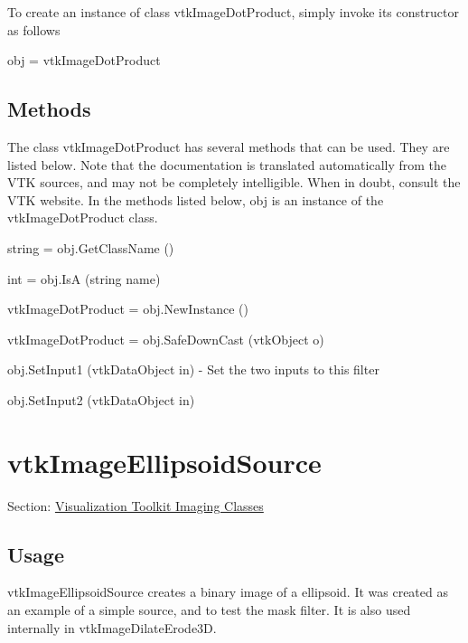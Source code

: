 To create an instance of class vtk\-Image\-Dot\-Product, simply invoke its constructor as follows \begin{DoxyVerb}  obj = vtkImageDotProduct
\end{DoxyVerb}
 \hypertarget{vtkwidgets_vtkxyplotwidget_Methods}{}\subsection{Methods}\label{vtkwidgets_vtkxyplotwidget_Methods}
The class vtk\-Image\-Dot\-Product has several methods that can be used. They are listed below. Note that the documentation is translated automatically from the V\-T\-K sources, and may not be completely intelligible. When in doubt, consult the V\-T\-K website. In the methods listed below, {\ttfamily obj} is an instance of the vtk\-Image\-Dot\-Product class. 
\begin{DoxyItemize}
\item {\ttfamily string = obj.\-Get\-Class\-Name ()}  
\item {\ttfamily int = obj.\-Is\-A (string name)}  
\item {\ttfamily vtk\-Image\-Dot\-Product = obj.\-New\-Instance ()}  
\item {\ttfamily vtk\-Image\-Dot\-Product = obj.\-Safe\-Down\-Cast (vtk\-Object o)}  
\item {\ttfamily obj.\-Set\-Input1 (vtk\-Data\-Object in)} -\/ Set the two inputs to this filter  
\item {\ttfamily obj.\-Set\-Input2 (vtk\-Data\-Object in)}  
\end{DoxyItemize}\hypertarget{vtkimaging_vtkimageellipsoidsource}{}\section{vtk\-Image\-Ellipsoid\-Source}\label{vtkimaging_vtkimageellipsoidsource}
Section\-: \hyperlink{sec_vtkimaging}{Visualization Toolkit Imaging Classes} \hypertarget{vtkwidgets_vtkxyplotwidget_Usage}{}\subsection{Usage}\label{vtkwidgets_vtkxyplotwidget_Usage}
vtk\-Image\-Ellipsoid\-Source creates a binary image of a ellipsoid. It was created as an example of a simple source, and to test the mask filter. It is also used internally in vtk\-Image\-Dilate\-Erode3\-D.

